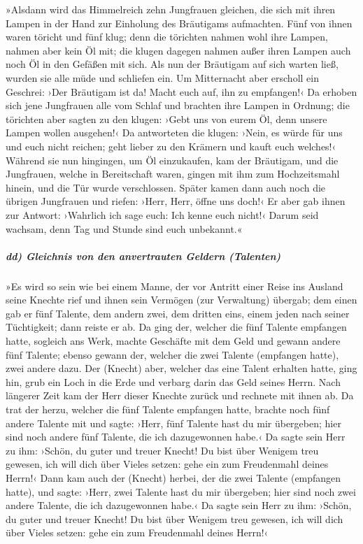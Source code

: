  »Alsdann wird das Himmelreich zehn Jungfrauen gleichen,
die sich mit ihren Lampen in der Hand zur Einholung des Bräutigams
aufmachten.  Fünf von ihnen waren töricht und fünf klug;
 denn die törichten nahmen wohl ihre Lampen, nahmen aber
kein Öl mit;  die klugen dagegen nahmen außer ihren Lampen
auch noch Öl in den Gefäßen mit sich.  Als nun der
Bräutigam auf sich warten ließ, wurden sie alle müde und schliefen ein.
 Um Mitternacht aber erscholl ein Geschrei: ›Der Bräutigam
ist da! Macht euch auf, ihn zu empfangen!‹  Da erhoben
sich jene Jungfrauen alle vom Schlaf und brachten ihre Lampen in
Ordnung;  die törichten aber sagten zu den klugen: ›Gebt
uns von eurem Öl, denn unsere Lampen wollen ausgehen!‹  Da
antworteten die klugen: ›Nein, es würde für uns und euch nicht reichen;
geht lieber zu den Krämern und kauft euch welches!‹ 
Während sie nun hingingen, um Öl einzukaufen, kam der Bräutigam, und die
Jungfrauen, welche in Bereitschaft waren, gingen mit ihm zum
Hochzeitsmahl hinein, und die Tür wurde verschlossen. 
Später kamen dann auch noch die übrigen Jungfrauen und riefen: ›Herr,
Herr, öffne uns doch!‹  Er aber gab ihnen zur Antwort:
›Wahrlich ich sage euch: Ich kenne euch nicht!‹  Darum
seid wachsam, denn Tag und Stunde sind euch unbekannt.«

\hypertarget{dd-gleichnis-von-den-anvertrauten-geldern-talenten}{%
\subparagraph{dd) Gleichnis von den anvertrauten Geldern
(Talenten)}\label{dd-gleichnis-von-den-anvertrauten-geldern-talenten}}

 »Es wird so sein wie bei einem Manne, der vor Antritt
einer Reise ins Ausland seine Knechte rief und ihnen sein Vermögen (zur
Verwaltung) übergab;  dem einen gab er fünf Talente, dem
andern zwei, dem dritten eins, einem jeden nach seiner Tüchtigkeit; dann
reiste er ab.  Da ging der, welcher die fünf Talente
empfangen hatte, sogleich ans Werk, machte Geschäfte mit dem Geld und
gewann andere fünf Talente;  ebenso gewann der, welcher
die zwei Talente (empfangen hatte), zwei andere dazu. 
Der (Knecht) aber, welcher das eine Talent erhalten hatte, ging hin,
grub ein Loch in die Erde und verbarg darin das Geld seines Herrn.
 Nach längerer Zeit kam der Herr dieser Knechte zurück
und rechnete mit ihnen ab.  Da trat der herzu, welcher
die fünf Talente empfangen hatte, brachte noch fünf andere Talente mit
und sagte: ›Herr, fünf Talente hast du mir übergeben; hier sind noch
andere fünf Talente, die ich dazugewonnen habe.‹  Da
sagte sein Herr zu ihm: ›Schön, du guter und treuer Knecht! Du bist über
Wenigem treu gewesen, ich will dich über Vieles setzen: gehe ein zum
Freudenmahl deines Herrn!‹  Dann kam auch der (Knecht)
herbei, der die zwei Talente (empfangen hatte), und sagte: ›Herr, zwei
Talente hast du mir übergeben; hier sind noch zwei andere Talente, die
ich dazugewonnen habe.‹  Da sagte sein Herr zu ihm:
›Schön, du guter und treuer Knecht! Du bist über Wenigem treu gewesen,
ich will dich über Vieles setzen: gehe ein zum Freudenmahl deines
Herrn!‹


